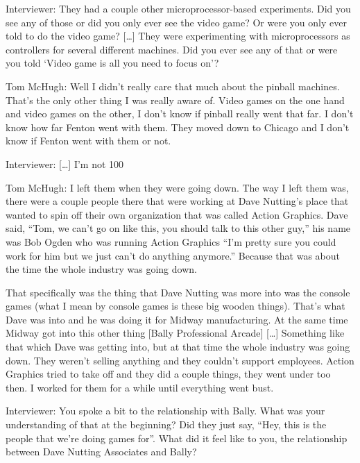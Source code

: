 \textcolor{interviewer}{Interviewer:} They had a couple other microprocessor-based experiments. Did you see any of those or did you only ever see the video game? Or were you only ever told to do the video game? […] They were experimenting with microprocessors as controllers for several different machines. Did you ever see any of that or were you told ‘Video game is all you need to focus on’?

\textcolor{interviewee}{Tom McHugh:} Well I didn’t really care that much about the pinball machines. That’s the only other thing I was really aware of. Video games on the one hand and video games on the other, I don’t know if pinball really went that far. I don’t know how far Fenton went with them. They moved down to Chicago and I don’t know if Fenton went with them or not.

\textcolor{interviewer}{Interviewer:} […] I’m not 100%

\textcolor{interviewee}{Tom McHugh:} I left them when they were going down. The way I left them was, there were a couple people there that were working at Dave Nutting’s place that wanted to spin off their own organization that was called Action Graphics. Dave said, “Tom, we can’t go on like this, you should talk to this other guy,” his name was Bob Ogden who was running Action Graphics “I’m pretty sure you could work for him but we just can’t do anything anymore.” Because that was about the time the whole industry was going down.

That specifically was the thing that Dave Nutting was more into was the console games (what I mean by console games is these big wooden things). That’s what Dave was into and he was doing it for Midway manufacturing. At the same time Midway got into this other thing [Bally Professional Arcade] […] Something like that which Dave was getting into, but at that time the whole industry was going down. They weren’t selling anything and they couldn’t support employees. Action Graphics tried to take off and they did a couple things, they went under too then. I worked for them for a while until everything went bust.

\textcolor{interviewer}{Interviewer:} You spoke a bit to the relationship with Bally. What was your understanding of that at the beginning? Did they just say, “Hey, this is the people that we’re doing games for”. What did it feel like to you, the relationship between Dave Nutting Associates and Bally?

